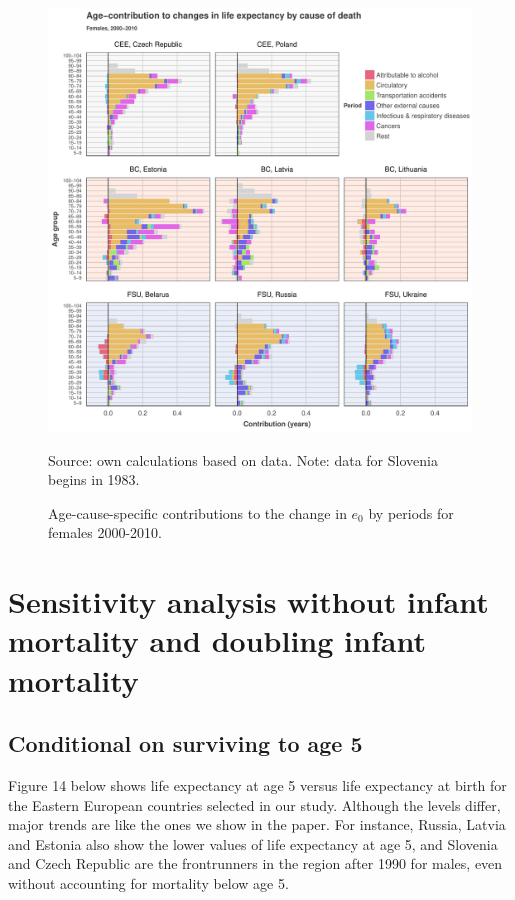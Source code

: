 \documentclass{article}
\begin{document}
\begin{figure}[h!]
\caption{Age-cause-specific contributions to the change in $e_0$ by periods for females 2000-2010.}
\centering
\begin{center}
\includegraphics[scale=.5]{Figures/Cause_e0_decomp_Females_2.pdf}
\end{center}
Source: own calculations based on \citet{HMD} data. Note: data for Slovenia begins in 1983.
\end{figure}

\newpage
\section*{Sensitivity analysis without infant mortality and doubling infant mortality}

\subsection*{Conditional on surviving to age 5}
Figure 14 below shows life expectancy at age 5 versus life expectancy at birth for the Eastern European countries selected in our study. Although the levels differ, major trends are like the ones we show in the paper. For instance, Russia, Latvia and Estonia also show the lower values of life expectancy at age 5, and Slovenia and Czech Republic are the frontrunners in the region after 1990 for males, even without accounting for mortality below age 5.
\end{document}
